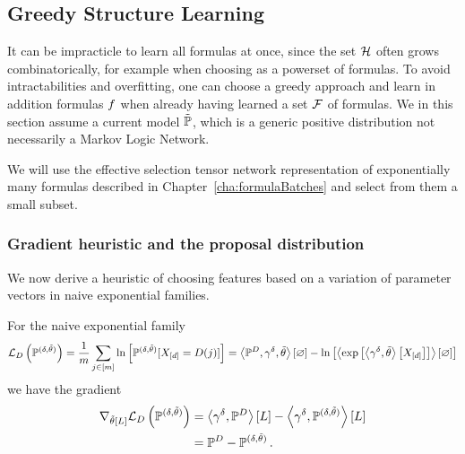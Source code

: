 






\subsection{Greedy Structure Learning}


It can be impracticle to learn all formulas at once, since the set $\mathcal{H}$ often grows combinatorically, for example when choosing as a powerset of formulas.
To avoid intractabilities and overfitting, one can choose a greedy approach and learn in addition formulas $f$ when already having learned a set $\mathcal{F}$ of formulas.
We in this section assume a current model $\tilde{\mathbb{P}}$, which is a generic positive distribution not necessarily a Markov Logic Network. %

% 
We will use the effective selection tensor network representation of exponentially many formulas described in Chapter~\ref{cha:formulaBatches} and select from them a small subset.




\subsubsection{Gradient heuristic and the proposal distribution}

We now derive a heuristic of choosing features based on a variation of parameter vectors in naive exponential families.

For the naive exponential family 
\begin{align*}
	\mathcal{L}_{D}\left(\mathbb{P}^{(\delta, \tilde{\theta})}\right) 
	= \frac{1}{m} \sum_{j\in[m]}\ln \left[ \mathbb{P}^{(\delta, \tilde{\theta})}[X_{[d]}=D(j)] \right]
	= \left\langle \mathbb{P}^{D}, \gamma^{\delta}, \tilde{\theta}\right\rangle \left[ \varnothing \right] - \ln \left[ \left\langle \mathrm{exp}\left[\left\langle \gamma^{\delta}, \tilde{\theta}\right\rangle \left[ X_{[d]} \right]\right]\right\rangle \left[ \varnothing \right] \right] 
\end{align*}
we have the gradient
\begin{align*}
	\nabla_{\tilde{\theta}\left[L\right]} \mathcal{L}_{D}\left(\mathbb{P}^{(\delta, \tilde{\theta})}\right)
	&= \left\langle \gamma^{\delta},\mathbb{P}^{D}\right\rangle \left[ L \right] - \left\langle \gamma^{\delta},\mathbb{P}^{(\delta, \tilde{\theta})}\right\rangle \left[ L \right] \\
	&= \mathbb{P}^{D} - \mathbb{P}^{(\delta, \tilde{\theta})} \, . 
\end{align*}

